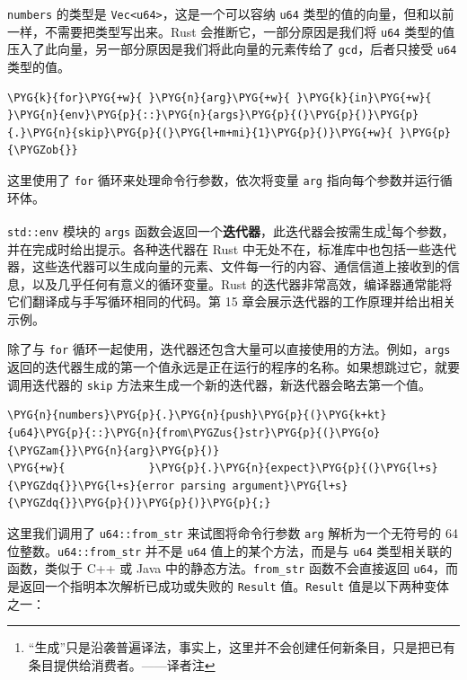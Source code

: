 \texttt{numbers} 的类型是 \texttt{Vec<u64>}，这是一个可以容纳 \texttt{u64} 类型的值的向量，但和以前一样，不需要把类型写出来。Rust 会推断它，一部分原因是我们将 \texttt{u64} 类型的值压入了此向量，另一部分原因是我们将此向量的元素传给了 \texttt{gcd}，后者只接受 \texttt{u64} 类型的值。

\begin{Verbatim}[commandchars=\\\{\},breaklines=true,breakanywhere=true,fontsize=\codefont,xleftmargin=17bp]
\PYG{k}{for}\PYG{+w}{ }\PYG{n}{arg}\PYG{+w}{ }\PYG{k}{in}\PYG{+w}{ }\PYG{n}{env}\PYG{p}{::}\PYG{n}{args}\PYG{p}{(}\PYG{p}{)}\PYG{p}{.}\PYG{n}{skip}\PYG{p}{(}\PYG{l+m+mi}{1}\PYG{p}{)}\PYG{+w}{ }\PYG{p}{\PYGZob{}}
\end{Verbatim}

这里使用了 \texttt{for} 循环来处理命令行参数，依次将变量 \texttt{arg} 指向每个参数并运行循环体。

\texttt{std::env} 模块的 \texttt{args} 函数会返回一个\textbf{迭代器}，此迭代器会按需生成\footnote{“生成”只是沿袭普遍译法，事实上，这里并不会创建任何新条目，只是把已有条目提供给消费者。——译者注}每个参数，并在完成时给出提示。各种迭代器在 Rust 中无处不在，标准库中也包括一些迭代器，这些迭代器可以生成向量的元素、文件每一行的内容、通信信道上接收到的信息，以及几乎任何有意义的循环变量。Rust 的迭代器非常高效，编译器通常能将它们翻译成与手写循环相同的代码。第 15 章会展示迭代器的工作原理并给出相关示例。

除了与 \texttt{for} 循环一起使用，迭代器还包含大量可以直接使用的方法。例如，\texttt{args} 返回的迭代器生成的第一个值永远是正在运行的程序的名称。如果想跳过它，就要调用迭代器的 \texttt{skip} 方法来生成一个新的迭代器，新迭代器会略去第一个值。

\begin{Verbatim}[commandchars=\\\{\},breaklines=true,breakanywhere=true,fontsize=\codefont,xleftmargin=17bp]
\PYG{n}{numbers}\PYG{p}{.}\PYG{n}{push}\PYG{p}{(}\PYG{k+kt}{u64}\PYG{p}{::}\PYG{n}{from\PYGZus{}str}\PYG{p}{(}\PYG{o}{\PYGZam{}}\PYG{n}{arg}\PYG{p}{)}
\PYG{+w}{             }\PYG{p}{.}\PYG{n}{expect}\PYG{p}{(}\PYG{l+s}{\PYGZdq{}}\PYG{l+s}{error parsing argument}\PYG{l+s}{\PYGZdq{}}\PYG{p}{)}\PYG{p}{)}\PYG{p}{;}
\end{Verbatim}

这里我们调用了 \texttt{u64::from\_str} 来试图将命令行参数 \texttt{arg} 解析为一个无符号的 64 位整数。\texttt{u64::from\_str} 并不是 \texttt{u64} 值上的某个方法，而是与 \texttt{u64} 类型相关联的函数，类似于 C++ 或 Java 中的静态方法。\texttt{from\_str} 函数不会直接返回 \texttt{u64}，而是返回一个指明本次解析已成功或失败的 \texttt{Result} 值。\texttt{Result} 值是以下两种变体之一：

